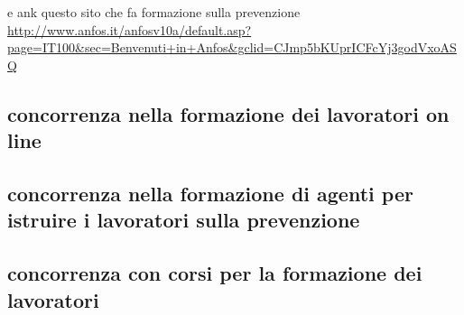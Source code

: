 e ank questo sito che fa formazione sulla prevenzione\\
\url{http://www.anfos.it/anfosv10a/default.asp?page=IT100&sec=Benvenuti+in+Anfos&gclid=CJmp5bKUprICFcYj3godVxoASQ}\\



\subsection{concorrenza nella formazione dei lavoratori on line}
\subsection{concorrenza nella formazione di agenti per istruire i lavoratori sulla prevenzione}
\subsection{concorrenza con corsi per la formazione dei lavoratori}



